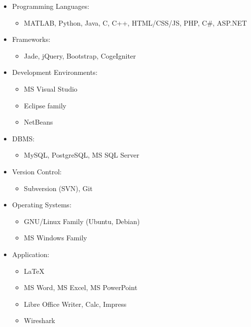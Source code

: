 \documentclass[letterpaper,11pt]{article}
\begin{document}
\begin{itemize}
 \item Programming Languages:
    \begin{itemize}
    \item MATLAB, Python, Java, C, C++, HTML/CSS/JS, PHP, C\#, ASP.NET
    \end{itemize}
 \item Frameworks:
    \begin{itemize}
    \item Jade, jQuery, Bootstrap, CogeIgniter
    \end{itemize}
 \item Development Environments:
    \begin{itemize}
    \item MS Visual Studio
    \item Eclipse family
    \item NetBeans
    \end{itemize}
 \item DBMS:
    \begin{itemize}
    \item MySQL, PostgreSQL, MS SQL Server
    \end{itemize}
 \item Version Control:
    \begin{itemize}
    \item Subversion (SVN), Git
    \end{itemize}
 \item Operating Systems:
    \begin{itemize}
    \item GNU/Linux Family (Ubuntu, Debian)
    \item MS Windows Family
    \end{itemize}
 \item Application:
    \begin{itemize}
    \item \LaTeX
    \item MS Word, MS Excel, MS PowerPoint
    \item Libre Office Writer, Calc, Impress
    \item Wireshark
    \end{itemize}
\end{itemize}
\end{document}
